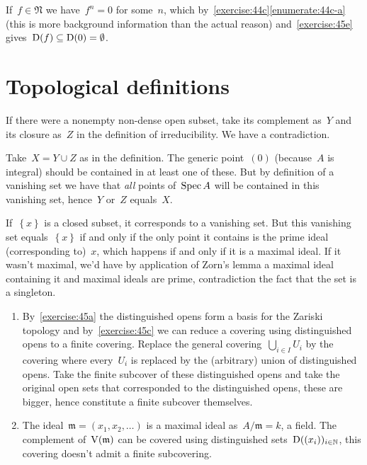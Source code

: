 \begin{exercise}
  If~$f\in\mathfrak{N}$ we have~$f^n=0$ for some~$n$, which by~\autoref{exercise:44c}\ref{enumerate:44c-a} (this is more background information than the actual reason) and~\autoref{exercise:45e} gives~$\operatorname{D}(f)\subseteq\operatorname{D}(0)=\emptyset$.
\end{exercise}


\section{Topological definitions}

\begin{exercise}
  If there were a nonempty non-dense open subset, take its complement as~$Y$ and its closure as~$Z$ in the definition of irreducibility. We have a contradiction.
\end{exercise}

\begin{exercise}
  Take~$X=Y\cup Z$ as in the definition. The generic point~$(0)$ (because~$A$ is integral) should be contained in at least one of these. But by definition of a vanishing set we have that \emph{all} points of~$\operatorname{Spec} A$ will be contained in this vanishing set, hence~$Y$ or~$Z$ equals~$X$.
\end{exercise}

\begin{exercise}
  If~$\left\{ x \right\}$ is a closed subset, it corresponds to a vanishing set. But this vanishing set equals~$\left\{ x \right\}$ if and only if the only point it contains is the prime ideal (corresponding to)~$x$, which happens if and only if it is a maximal ideal. If it wasn't maximal, we'd have by application of Zorn's lemma a maximal ideal containing it and maximal ideals are prime, contradiction the fact that the set is a singleton.
\end{exercise}

\begin{exercise}
  \label{exercise:46d}
  \begin{enumerate}
    \item By~\autoref{exercise:45a} the distinguished opens form a basis for the Zariski topology and by~\autoref{exercise:45c} we can reduce a covering using distinguished opens to a finite covering. Replace the general covering~$\bigcup_{i\in I}U_i$ by the covering where every~$U_i$ is replaced by the (arbitrary) union of distinguished opens. Take the finite subcover of these distinguished opens and take the original open sets that corresponded to the distinguished opens, these are bigger, hence constitute a finite subcover themselves.

    \item\label{enumerate:46d-b} The ideal~$\mathfrak{m}=(x_1,x_2,\ldots)$ is a maximal ideal as~$A/\mathfrak{m}=k$, a field. The complement of~$\operatorname{V}(\mathfrak{m})$ can be covered using distinguished sets~$\operatorname{D}((x_i))_{i\in\mathbb{N}}$, this covering doesn't admit a finite subcovering.
  \end{enumerate}
\end{exercise}

